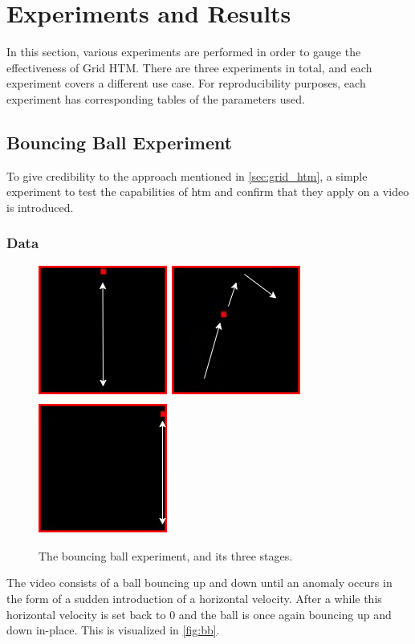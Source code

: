\chapter{Experiments and Results}
\label{sec:experiments}
In this section, various experiments are performed in order to gauge the effectiveness of Grid HTM. There are three experiments in total, and each experiment covers a different use case. For reproducibility purposes, each experiment has corresponding tables of the parameters used.
\section{Bouncing Ball Experiment}
To give credibility to the approach mentioned in \autoref{sec:grid_htm}, a simple experiment to test the capabilities of \gls*{htm} and confirm that they apply on a video is introduced.
\subsection{Data}
\begin{figure}[H]
    \centering
    \includegraphics[width=.3\textwidth]{resources/experiments/bouncing_ball/bb_updown1.png}\hfill
    \includegraphics[width=.3\textwidth]{resources/experiments/bouncing_ball/bb_updownside.png}\hfill
    \includegraphics[width=.3\textwidth]{resources/experiments/bouncing_ball/bb_updown2.png}
    \caption[Bouncing Ball Experiment]{The bouncing ball experiment, and its three stages.}
    \label{fig:bb}
\end{figure}
The video consists of a ball bouncing up and down until an anomaly occurs in the form of a sudden introduction of a horizontal velocity. After a while this horizontal velocity is set back to 0 and the ball is once again bouncing up and down in-place. This is visualized in \autoref{fig:bb}.
\par
